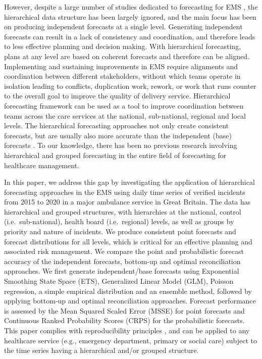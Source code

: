 \documentclass[
  authoryear,
  preprint,
  3p]{elsarticle}
\begin{document}
However, despite a large number of studies dedicated to forecasting for
EMS
\citep{mingliterature2022, gul2020exhaustive, ibrahim2016modeling, wargon2009systematic},
the hierarchical data structure has been largely ignored, and the main
focus has been on producing independent forecasts at a single level.
Generating independent forecasts can result in a lack of consistency and
coordination, and therefore leads to less effective planning and
decision making. With hierarchical forecasting, plans at any level are
based on coherent forecasts and therefore can be aligned. Implementing
and sustaining improvements in EMS require alignments and coordination
between different stakeholders, without which teams operate in isolation
leading to conflicts, duplication work, rework, or work that runs
counter to the overall goal to improve the quality of delivery service.
Hierarchical forecasting framework can be used as a tool to improve
coordination between teams across the care services at the national,
sub-national, regional and local levels. The hierarchical forecasting
approaches not only create consistent forecasts, but are usually also
more accurate than the independent (base) forecasts
\citep{hyndman2011optimal}. To our knowledge, there has been no previous
research involving hierarchical and grouped forecasting in the entire
field of forecasting for healthcare management.

In this paper, we address this gap by investigating the application of
hierarchical forecasting approaches in the EMS using daily time series
of verified incidents from 2015 to 2020 in a major ambulance service in
Great Britain. The data has hierarchical and grouped structures, with
hierarchies at the national, control (i.e.~sub-national), health board
(i.e.~regional) levels, as well as groups by priority and nature of
incidents. We produce consistent point forecasts and forecast
distributions for all levels, which is critical for an effective
planning and associated risk management. We compare the point and
probabilistic forecast accuracy of the independent forecasts, bottom-up
and optimal reconciliation approaches. We first generate
independent/base forecasts using Exponential Smoothing State Space
(ETS), Generalized Linear Model (GLM), Poisson regression, a simple
empirical distribution and an ensemble method, followed by applying
bottom-up and optimal reconciliation approaches. Forecast performance is
assessed by the Mean Squared Scaled Error (MSSE) for point forecasts and
Continuous Ranked Probability Scores (CRPS) for the probabilistic
forecasts. This paper complies with reproducibility principles
\citep{stodden2013best, boylan2015reproducibility}, and can be applied
to any healthcare service (e.g., emergency department, primary or social
care) subject to the time series having a hierarchical and/or grouped
structure.
\end{document}
